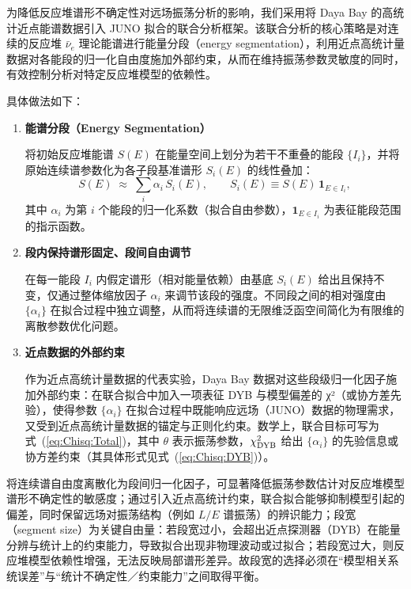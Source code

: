 为降低反应堆谱形不确定性对远场振荡分析的影响，我们采用将 Daya Bay 的高统计近点能谱数据引入 JUNO 拟合的联合分析框架。该联合分析的核心策略是对连续的反应堆 $\bar{\nu}_e$ 理论能谱进行能量分段（energy segmentation），利用近点高统计量数据对各能段的归一化自由度施加外部约束，从而在维持振荡参数灵敏度的同时，有效控制分析对特定反应堆模型的依赖性。


具体做法如下：

\begin{enumerate}
  \item \textbf{能谱分段（Energy Segmentation）}
  
  将初始反应堆能谱 $S(E)$ 在能量空间上划分为若干不重叠的能段 $\{I_i\}$，并将原始连续谱参数化为各子段基准谱形 $S_i(E)$ 的线性叠加：
  $$
    S(E)\;\approx\;\sum_{i}\alpha_i\,S_i(E),\qquad S_i(E)\equiv S(E)\,\mathbf{1}_{E\in I_i},
  $$
  其中 $\alpha_i$ 为第 $i$ 个能段的归一化系数（拟合自由参数），$\mathbf{1}_{E\in I_i}$ 为表征能段范围的指示函数。
  
  \item \textbf{段内保持谱形固定、段间自由调节}
  
  在每一能段 $I_i$ 内假定谱形（相对能量依赖）由基底 $S_i(E)$ 给出且保持不变，仅通过整体缩放因子 $\alpha_i$ 来调节该段的强度。不同段之间的相对强度由 $\{\alpha_i\}$ 在拟合过程中独立调整，从而将连续谱的无限维泛函空间简化为有限维的离散参数优化问题。
  
\item \textbf{近点数据的外部约束}
  
  作为近点高统计量数据的代表实验，Daya Bay 数据对这些段级归一化因子施加外部约束：在联合拟合中加入一项表征 DYB 与模型偏差的 χ²（或协方差先验），使得参数 $\{\alpha_i\}$ 在拟合过程中既能响应远场（JUNO）数据的物理需求，又受到近点高统计量数据的锚定与正则化约束。数学上，联合目标可写为式~(\ref{eq:Chisq:Total})，其中 $\theta$ 表示振荡参数，$\chi^2_{\rm DYB}$ 给出 $\{\alpha_i\}$ 的先验信息或协方差约束（其具体形式见式~(\ref{eq:Chisq:DYB})）。
\end{enumerate}


将连续谱自由度离散化为段间归一化因子，可显著降低振荡参数估计对反应堆模型谱形不确定性的敏感度；通过引入近点高统计约束，联合拟合能够抑制模型引起的偏差，同时保留远场对振荡结构（例如 $L/E$ 谱振荡）的辨识能力；段宽（segment size）为关键自由量：若段宽过小，会超出近点探测器（DYB）在能量分辨与统计上的约束能力，导致拟合出现非物理波动或过拟合；若段宽过大，则反应堆模型依赖性增强，无法反映局部谱形差异。故段宽的选择必须在“模型相关系统误差”与“统计不确定性／约束能力”之间取得平衡。
        
